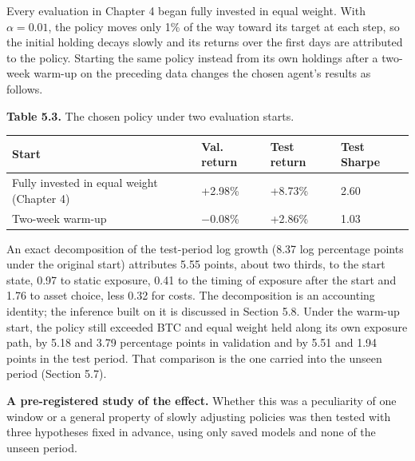 \documentclass[12pt,a4paper]{report}
\newcounter{none} %
\begin{document}
Every evaluation in Chapter 4 began fully invested in equal weight. With
\(\alpha = 0.01\), the policy moves only 1\% of the way toward its
target at each step, so the initial holding decays slowly and its
returns over the first days are attributed to the policy. Starting the
same policy instead from its own holdings after a two-week warm-up on
the preceding data changes the chosen agent's results as follows.

\textbf{Table 5.3.} The chosen policy under two evaluation starts.

{\small
\begin{longtable}[]{@{}llll@{}}
\toprule\noalign{}
Start & Val. return & Test return & Test Sharpe \\
\midrule\noalign{}
\endhead
\bottomrule\noalign{}
\endlastfoot
Fully invested in equal weight (Chapter 4) & +2.98\% & +8.73\% & 2.60 \\
Two-week warm-up & −0.08\% & +2.86\% & 1.03 \\
\end{longtable}
}

An exact decomposition of the test-period log growth (8.37 log
percentage points under the original start) attributes 5.55 points,
about two thirds, to the start state, 0.97 to static exposure, 0.41 to
the timing of exposure after the start and 1.76 to asset choice, less
0.32 for costs. The decomposition is an accounting identity; the
inference built on it is discussed in Section 5.8. Under the warm-up
start, the policy still exceeded BTC and equal weight held along its own
exposure path, by 5.18 and 3.79 percentage points in validation and by
5.51 and 1.94 points in the test period. That comparison is the one
carried into the unseen period (Section 5.7).

\textbf{A pre-registered study of the effect.} Whether this was a
peculiarity of one window or a general property of slowly adjusting
policies was then tested with three hypotheses fixed in advance, using
only saved models and none of the unseen period.
\end{document}
